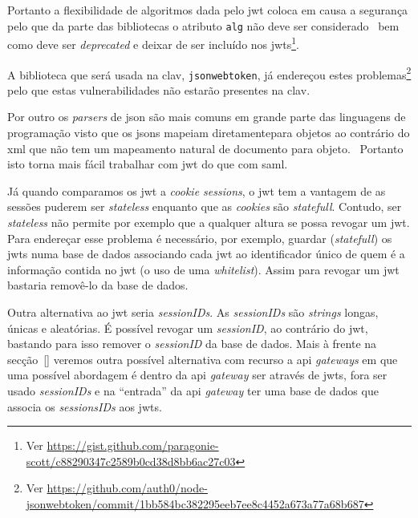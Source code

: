Portanto a flexibilidade de algoritmos dada pelo \acrshort{jwt} coloca em causa a segurança pelo que da parte das bibliotecas o atributo \texttt{alg} não deve ser considerado~\cite{jwtvuln} bem como deve ser \textit{deprecated} e deixar de ser incluído nos \acrshort{jwt}s\footnote{Ver \url{https://gist.github.com/paragonie-scott/c88290347c2589b0cd38d8bb6ac27c03}}. 

A biblioteca que será usada na \acrshort{clav}, \texttt{jsonwebtoken}, já endereçou estes problemas\footnote{Ver \url{https://github.com/auth0/node-jsonwebtoken/commit/1bb584bc382295eeb7ee8c4452a673a77a68b687}} pelo que estas vulnerabilidades não estarão presentes na \acrshort{clav}.

Por outro os \textit{parsers} de \acrshort{json} são mais comuns em grande parte das linguagens de programação visto que os \acrshort{json}s mapeiam diretamentepara objetos ao contrário do \acrshort{xml} que não tem um mapeamento natural de documento para objeto.~\cite{jwtio} Portanto isto torna mais fácil trabalhar com \acrshort{jwt} do que com \acrshort{saml}.

Já quando comparamos os \acrshort{jwt} a \textit{cookie sessions}, o \acrshort{jwt} tem a vantagem de as sessões puderem ser \textit{stateless} enquanto que as \textit{cookies} são \textit{statefull}. Contudo, ser \textit{stateless} não permite por exemplo que a qualquer altura se possa revogar um \acrshort{jwt}. Para endereçar esse problema é necessário, por exemplo, guardar (\textit{statefull}) os \acrshort{jwt}s numa base de dados associando cada \acrshort{jwt} ao identificador único de quem é a informação contida no \acrshort{jwt} (o uso de uma \textit{whitelist}). Assim para revogar um \acrshort{jwt} bastaria removê-lo da base de dados.

Outra alternativa ao \acrshort{jwt} seria \textit{sessionIDs}. As \textit{sessionIDs} são \textit{strings} longas, únicas e aleatórias. É possível revogar um \textit{sessionID}, ao contrário do \acrshort{jwt}, bastando para isso remover o \textit{sessionID} da base de dados. Mais à frente na secção~\ref{} veremos outra possível alternativa com recurso a \acrshort{api} \textit{gateways} em que uma possível abordagem é dentro da \acrshort{api} \textit{gateway} ser através de \acrshort{jwt}s, fora ser usado \textit{sessionIDs} e na ``entrada'' da \acrshort{api} \textit{gateway} ter uma base de dados que associa os \textit{sessionsIDs} aos \acrshort{jwt}s.


